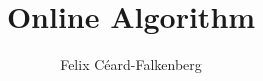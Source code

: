 \documentclass{article}
\title{Online Algorithm}
\author{Felix Céard-Falkenberg}
\begin{document}
\maketitle



\newenvironment{task}
{%
  \begin{tcolorbox}[width=\textwidth,
                    colback=mintbg,
                    title=What should we do in this section?,
                    outer arc=0mm,
                    colupper=black]%
}%
{%
  \end{tcolorbox}%
}



% 



% 
\end{document}
